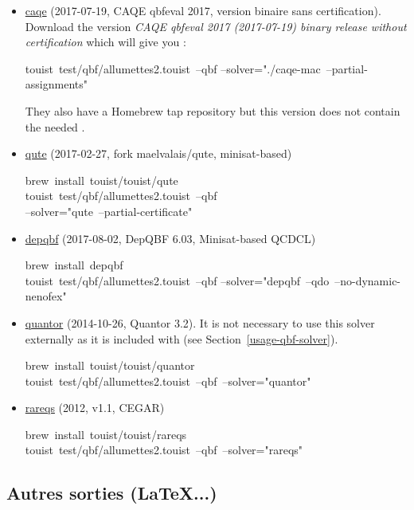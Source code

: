 \begin{itemize}%

\item{}
\href{https://www.react.uni-saarland.de/tools/caqe/index.html}{caqe} (2017-07-19, CAQE qbfeval 2017, version binaire sans certification).
Download the version \emph{CAQE qbfeval 2017 (2017-07-19) binary release without certification}
which will give you :%
\begin{footnotesize}
\begin{mdpre}%
\noindent touist~test/qbf/allumettes2.touist~--qbf
    --solver="./caqe-mac~--partial-assignments"%
\end{mdpre}
\end{footnotesize}

They also have a Homebrew tap repository but this version does not contain the needed .%

\item{}
\href{https://github.com/perebor/qute}{qute} (2017-02-27, fork maelvalais/qute, minisat-based)%
\begin{footnotesize}
\begin{mdpre}%
\noindent brew~install~touist/touist/qute\\
touist~test/qbf/allumettes2.touist~--qbf\\
\qquad\qquad --solver="qute~--partial-certificate"%
\end{mdpre}%
\end{footnotesize}

\item{}
\href{http://lonsing.github.io/depqbf/}{depqbf} (2017-08-02, DepQBF 6.03, Minisat-based QCDCL)%
\begin{mdpre}%
\noindent brew~install~depqbf\\
touist~test/qbf/allumettes2.touist~--qbf
\qquad\qquad --solver="depqbf~--qdo~--no-dynamic-nenofex"%
\end{mdpre}%

\item{}
\href{http://fmv.jku.at/quantor/}{quantor} (2014-10-26, Quantor 3.2). It is not necessary to use this
solver externally as it is included with  (see Section~\ref{usage-qbf-solver}).%
\begin{mdpre}%
\noindent brew~install~touist/touist/quantor\\
touist~test/qbf/allumettes2.touist~--qbf~--solver="quantor"%
\end{mdpre}%

\item{}
\href{http://sat.inesc-id.pt/~mikolas/sw/areqs/}{rareqs} (2012, v1.1, CEGAR)%
\begin{mdpre}%
\noindent brew~install~touist/touist/rareqs\\
touist~test/qbf/allumettes2.touist~--qbf~--solver="rareqs"%
\end{mdpre}%
\end{itemize}%


%
%
\subsection{Autres sorties (\LaTeX...)}

